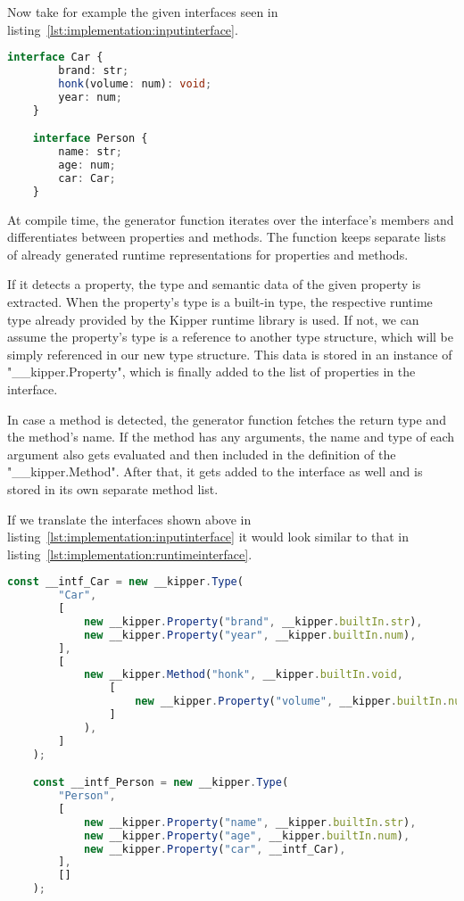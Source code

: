 Now take for example the given interfaces seen in listing~\ref{lst:implementation:inputinterface}.

\begin{lstlisting}[language=Typescript,caption=Example interfaces in the Kipper language,label=lst:implementation:inputinterface]
	interface Car {
		brand: str;
		honk(volume: num): void;
		year: num;
	}

	interface Person {
		name: str;
		age: num;
		car: Car;
	}
\end{lstlisting}

At compile time, the generator function iterates over the interface's members and differentiates between properties and methods. The function keeps separate lists of already generated runtime representations for properties and methods.

If it detects a property, the type and semantic data of the given property is extracted. When the property's type is a built-in type, the respective runtime type already provided by the Kipper runtime library is used. If not, we can assume the property's type is a reference to another type structure, which will be simply referenced in our new type structure. This data is stored in an instance of "\_\_kipper.Property", which is finally added to the list of properties in the interface.

In case a method is detected, the generator function fetches the return type and the method's name. If the method has any arguments, the name and type of each argument also gets evaluated and then included in the definition of the "\_\_kipper.Method". After that, it gets added to the interface as well and is stored in its own separate method list.

If we translate the interfaces shown above in listing~\ref{lst:implementation:inputinterface} it would look similar to that in listing~\ref{lst:implementation:runtimeinterface}.

\begin{lstlisting}[language=Typescript,caption=The runtime representation of the previous interfaces,label=lst:implementation:runtimeinterface]
	const __intf_Car = new __kipper.Type(
		"Car",
		[
			new __kipper.Property("brand", __kipper.builtIn.str),
			new __kipper.Property("year", __kipper.builtIn.num),
		],
		[
			new __kipper.Method("honk", __kipper.builtIn.void,
				[
					new __kipper.Property("volume", __kipper.builtIn.num),
				]
			),
		]
	);

	const __intf_Person = new __kipper.Type(
		"Person",
		[
			new __kipper.Property("name", __kipper.builtIn.str),
			new __kipper.Property("age", __kipper.builtIn.num),
			new __kipper.Property("car", __intf_Car),
		],
		[]
	);
\end{lstlisting}


